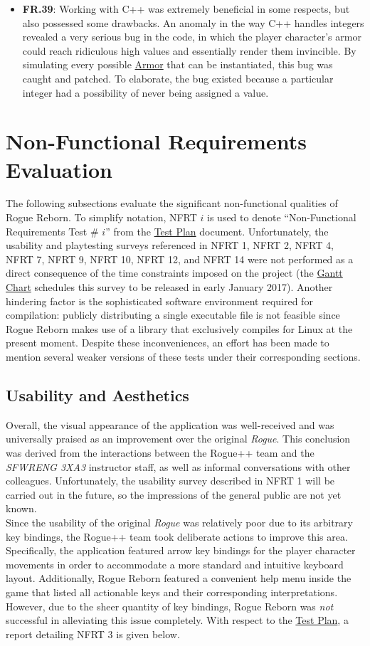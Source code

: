 \documentclass[12pt, titlepage]{article}
\newcommand{\newsection}[1]{\newpage\section{#1}}
\begin{document}
\begin{itemize}
		\item[] \textbf{FR.39}: Working with C++ was extremely beneficial in some respects, but also possessed some drawbacks.  An anomaly in the way C++ handles integers revealed a very serious bug in the code, in which the player character's armor could reach ridiculous high values and essentially render them invincible.  By simulating every possible \hyperref[Section_M_Trace]{Armor} that can be instantiated, this bug was caught and patched.  To elaborate, the bug existed because a particular integer had a possibility of never being assigned a value.
	\end{itemize}


\newsection{Non-Functional Requirements Evaluation} \label{Section_NFR_Evaluation}
	The following subsections evaluate the significant non-functional qualities of Rogue Reborn.  To simplify notation, NFRT $i$ is used to denote ``Non-Functional Requirements Test \# $i$'' from the \href{run:../TestPlan/TestPlan.pdf}{Test Plan} document.  Unfortunately, the usability and playtesting surveys referenced in NFRT 1, NFRT 2, NFRT 4, NFRT 7, NFRT 9, NFRT 10, NFRT 12, and NFRT 14 were not performed as a direct consequence of the time constraints imposed on the project (the \href{run:../../ProjectSchedule/rogue.gan}{Gantt Chart} schedules this survey to be released in early January 2017).  Another hindering factor is the sophisticated software environment required for compilation: publicly distributing a single executable file is not feasible since Rogue Reborn makes use of a library that exclusively compiles for Linux at the present moment.  Despite these inconveniences, an effort has been made to mention several weaker versions of these tests under their corresponding sections.

	\subsection{Usability and Aesthetics}
		Overall, the visual appearance of the application was well-received and was universally praised as an improvement over the original \textit{Rogue}.  This conclusion was derived from the interactions between the Rogue++ team and the \textit{SFWRENG 3XA3} instructor staff, as well as informal conversations with other colleagues.  Unfortunately, the usability survey described in NFRT 1 will be carried out in the future, so the impressions of the general public are not yet known.\\

		Since the usability of the original \textit{Rogue} was relatively poor due to its arbitrary key bindings, the Rogue++ team took deliberate actions to improve this area.  Specifically, the application featured arrow key bindings for the player character movements in order to accommodate a more standard and intuitive keyboard layout.  Additionally, Rogue Reborn featured a convenient help menu inside the game that listed all actionable keys and their corresponding interpretations.  However, due to the sheer quantity of key bindings, Rogue Reborn was \textit{not} successful in alleviating this issue completely.  With respect to the \href{run:../TestPlan/TestPlan.pdf}{Test Plan}, a report detailing NFRT 3 is given below.
\end{document}
